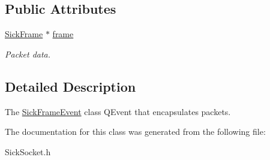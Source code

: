 \subsection*{Public Attributes}
\begin{DoxyCompactItemize}
\item 
\hypertarget{classpacpus_1_1SickFrameEvent_a8d27195b76d8c8d403c0e139347985aa}{\hyperlink{classpacpus_1_1SickFrame}{Sick\-Frame} $\ast$ \hyperlink{classpacpus_1_1SickFrameEvent_a8d27195b76d8c8d403c0e139347985aa}{frame}}\label{classpacpus_1_1SickFrameEvent_a8d27195b76d8c8d403c0e139347985aa}

\begin{DoxyCompactList}\small\item\em Packet data. \end{DoxyCompactList}\end{DoxyCompactItemize}


\subsection{Detailed Description}
The \hyperlink{classpacpus_1_1SickFrameEvent}{Sick\-Frame\-Event} class Q\-Event that encapsulates packets. 

The documentation for this class was generated from the following file\-:\begin{DoxyCompactItemize}
\item 
Sick\-Socket.\-h\end{DoxyCompactItemize}

